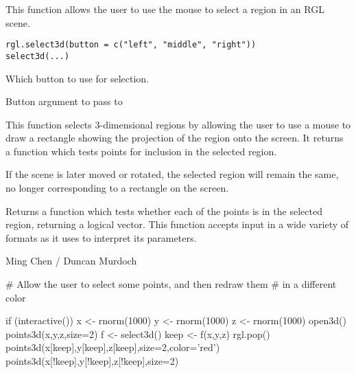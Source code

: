\begin{Description}\relax
This function allows the user to use the mouse to
select a region in an RGL scene.
\end{Description}
\begin{Usage}
\begin{verbatim}
rgl.select3d(button = c("left", "middle", "right"))
select3d(...)
\end{verbatim}
\end{Usage}
\begin{Arguments}
\begin{ldescription}
\item[\code{ button }] Which button to use for selection.
\item[\code{ ... }] Button argument to pass to 
\end{ldescription}
\end{Arguments}
\begin{Details}\relax
This function selects 3-dimensional regions by allowing the
user to use a mouse to draw a rectangle showing
the projection of the region onto the screen.  It returns
a function which tests points for inclusion in the selected region.

If the scene is later moved or rotated, the selected region will 
remain the same, no longer corresponding to a rectangle on the screen.
\end{Details}
\begin{Value}
Returns a function  which tests whether each
of the points  is in the selected region, returning
a logical vector.  This function accepts input in a wide
variety of formats as it uses  
to interpret its parameters.
\end{Value}
\begin{Author}\relax
Ming Chen / Duncan Murdoch
\end{Author}
\begin{SeeAlso}\relax
{}
\end{SeeAlso}
\begin{Examples}
\begin{ExampleCode}

# Allow the user to select some points, and then redraw them
# in a different color

if (interactive()) {
 x <- rnorm(1000)
 y <- rnorm(1000)
 z <- rnorm(1000)
 open3d()
 points3d(x,y,z,size=2)
 f <- select3d()
 keep <- f(x,y,z)
 rgl.pop()
 points3d(x[keep],y[keep],z[keep],size=2,color='red')
 points3d(x[!keep],y[!keep],z[!keep],size=2)
}
\end{ExampleCode}
\end{Examples}

